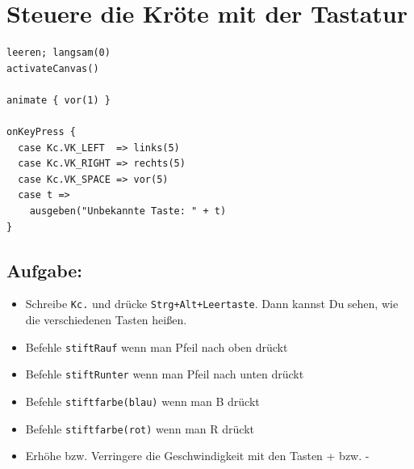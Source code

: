 \chapter{Steuere die Kröte mit der Tastatur}
\begin{multicols}{2}

\begin{lstlisting}[basicstyle={\ttfamily\fontsize{18}{22}\selectfont},numbers=none]
leeren; langsam(0)
activateCanvas()

animate { vor(1) }

onKeyPress {
  case Kc.VK_LEFT  => links(5)
  case Kc.VK_RIGHT => rechts(5)
  case Kc.VK_SPACE => vor(5)
  case t => 
    ausgeben("Unbekannte Taste: " + t)
}
\end{lstlisting}
        


\columnbreak


\section*{\color{BrickRed}Aufgabe:}


\begin{itemize}

\item {Schreibe \lstinline{Kc.} und drücke \lstinline{Strg+Alt+Leertaste}. Dann kannst Du sehen, wie die verschiedenen Tasten heißen.}
\item {Befehle \lstinline{stiftRauf} wenn man Pfeil nach oben drückt}
\item {Befehle \lstinline{stiftRunter} wenn man Pfeil nach unten drückt}
\item {Befehle \lstinline{stiftfarbe(blau)} wenn man B drückt}
\item {Befehle \lstinline{stiftfarbe(rot)} wenn man R drückt}
\item {Erhöhe bzw. Verringere die Geschwindigkeit mit den Tasten + bzw. -}

\end{itemize}


\end{multicols}

